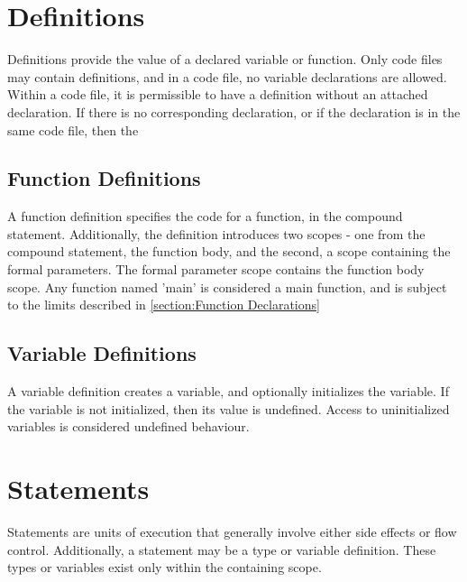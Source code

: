\documentclass[letterpaper,12pt]{book}
\begin{document}
\chapter{Definitions}



Definitions provide the value of a declared variable or function. Only code files may contain definitions, and in a code file, no variable declarations are allowed. Within a code file, it is permissible to have a definition without an attached declaration. If there is no corresponding declaration, or if the declaration is in the same code file, then the 

\section{Function Definitions}



A function definition specifies the code for a function, in the compound statement. Additionally, the definition introduces two scopes - one from the compound statement, the function body, and the second, a scope containing the formal parameters. The formal parameter scope contains the function body scope. Any function named 'main' is considered a main function, and is subject to the limits described in \ref{section:Function Declarations}

\section{Variable Definitions}



A variable definition creates a variable, and optionally initializes the variable. If the variable is not initialized, then its value is undefined. Access to uninitialized variables is considered undefined behaviour.

\chapter{Statements}



Statements are units of execution that generally involve either side effects or flow control. Additionally, a statement may be a type or variable definition. These types or variables exist only within the containing scope.
\end{document}

